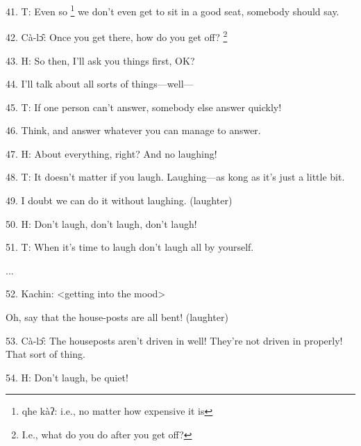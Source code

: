 41. T: Even so \footnote{qhe kàʔ: i.e., no matter how expensive it is} we don't even get to sit in a good seat, somebody should say.

42. Cà-lɔ̂: Once you get there, how do you get off? \footnote{I.e., what do you do after you get off?}

43. H: So then, I'll ask you things first, OK?

44. I'll talk about all sorts of things---well---

45. T: If one person can't answer, somebody else answer quickly!

46. Think, and answer whatever you can manage to answer.

47. H: About everything, right?  And no laughing!

48. T: It doesn't matter if you laugh. Laughing---as kong as it's just a little
bit.

49. I doubt we can do it without laughing. (laughter)

50. H: Don't laugh, don't laugh, don't laugh!

51. T: When it's time to laugh don't laugh all by yourself.

...

52. Kachin: <getting into the mood>

Oh, say that the house-posts are all bent! (laughter)

53. Cà-lɔ̂: The houseposts aren't driven in well!  They're not driven in properly!
That sort of thing.

54. H: Don't laugh, be quiet!

